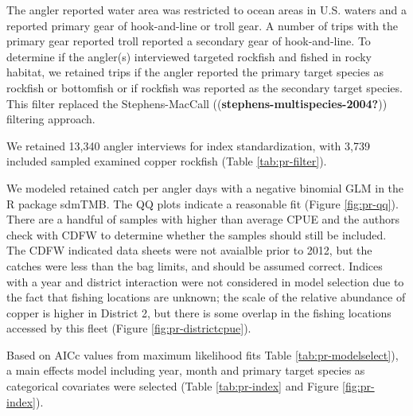 \documentclass[11pt,
  english,
  letterpaper,
]{article}
\begin{document}
The angler reported water area was restricted to ocean areas in U.S. waters and a reported primary gear of hook-and-line or troll gear. A number of trips with the primary gear reported troll reported a secondary gear of hook-and-line. To determine if the angler(s) interviewed targeted rockfish and fished in rocky habitat, we retained trips if the angler reported the primary target species as rockfish or bottomfish or if rockfish was reported as the secondary target species. This filter replaced the Stephens-MacCall ((\textbf{stephens-multispecies-2004?})) filtering approach.

We retained 13,340 angler interviews for index standardization, with 3,739 included sampled examined copper rockfish (Table \ref{tab:pr-filter}).

We modeled retained catch per angler days with a negative binomial GLM in the R package sdmTMB. The QQ plots indicate a reasonable fit (Figure \ref{fig:pr-qq}). There are a handful of samples with higher than average CPUE and the authors check with CDFW to determine whether the samples should still be included. The CDFW indicated data sheets were not avaialble prior to 2012, but the catches were less than the bag limits, and should be assumed correct. Indices with a year and district interaction were not considered in model selection due to the fact that fishing locations are unknown; the scale of the relative abundance of copper is higher in District 2, but there is some overlap in the fishing locations accessed by this fleet (Figure \ref{fig:pr-districtcpue}).

Based on AICc values from maximum likelihood fits Table \ref{tab:pr-modelselect}), a main effects model including year, month and primary target species as categorical covariates were selected (Table \ref{tab:pr-index} and Figure \ref{fig:pr-index}).

\newpage

\begingroup\fontsize{10}{12}\selectfont
\begingroup\fontsize{10}{12}\selectfont
\end{document}
